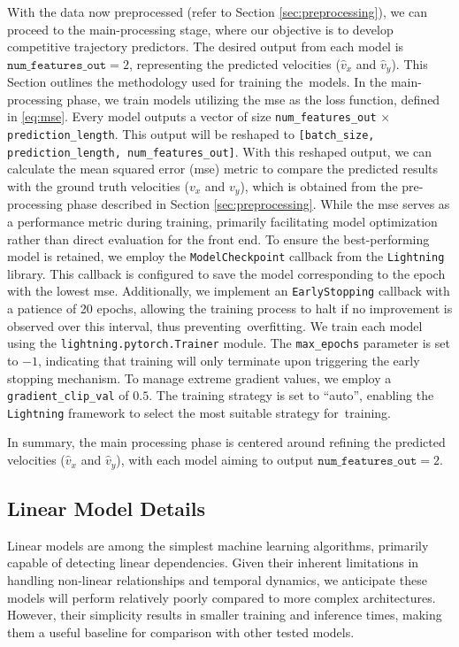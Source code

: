\parbox{\textwidth}{
With the data now preprocessed (refer to Section \ref{sec:preprocessing}), we can proceed to the main-processing stage, where our objective is to develop competitive trajectory predictors. The desired output from each model is $\texttt{num\_features\_out} = 2$, representing the predicted velocities  (\(\hat{v}_x\) and \(\hat{v}_y\)). This Section outlines the methodology used for training the~models.
In the main-processing phase, we train models utilizing the \gls{mse} as the loss function, defined in \ref{eq:mse}. Every model outputs a vector of size \texttt{num\_features\_out} $\times$ \texttt{prediction\_length}. This output will be reshaped to \texttt{[batch\_size, prediction\_length, num\_features\_out]}. With this reshaped output, we can calculate the mean squared error (\gls{mse}) metric to compare the predicted results with the ground truth velocities (\(v_x\) and \(v_y\)), which is obtained from the pre-processing phase described in Section \ref{sec:preprocessing}. While the \gls{mse} serves as a performance metric during training, primarily facilitating model optimization rather than direct evaluation for the front end. To ensure the best-performing model is retained, we employ the \texttt{ModelCheckpoint} callback from the \texttt{Lightning} library. This callback is configured to save the model corresponding to the epoch with the lowest \gls{mse}. Additionally, we implement an \texttt{EarlyStopping} callback with a patience of 20 epochs, allowing the training process to halt if no improvement is observed over this interval, thus preventing~overfitting.
We train each model using the \texttt{lightning.pytorch.Trainer} module. The \texttt{max\_epochs} parameter is set to $-1$, indicating that training will only terminate upon triggering the early stopping mechanism. To manage extreme gradient values, we employ a \texttt{gradient\_clip\_val} of $0.5$. The training strategy is set to ``auto'', enabling the \texttt{Lightning} framework to select the most suitable strategy for~training.

In summary, the main processing phase is centered around refining the predicted velocities  (\(\hat{v}_x\) and \(\hat{v}_y\)), with each model aiming to output $\texttt{num\_features\_out} = 2$.}


\subsection{Linear Model Details}
Linear models are among the simplest machine learning algorithms, primarily capable of detecting linear dependencies. Given their inherent limitations in handling non-linear relationships and temporal dynamics, we anticipate these models will perform relatively poorly compared to more complex architectures. However, their simplicity results in smaller training and inference times, making them a useful baseline for comparison with other tested models.

